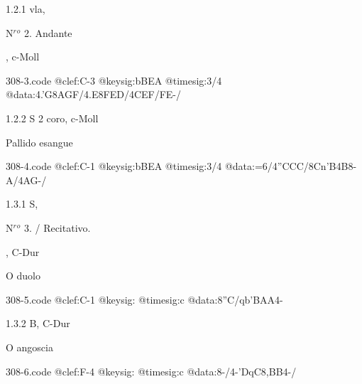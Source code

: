 \documentclass[twocolumn, 12pt]{book}
\begin{document}
\newline %
\par 1.2.1  vla, \begin{itshape}N$^r$$^o$ 2. Andante\end{itshape}, c-Moll  
\begin{filecontents*}{308-3.code}
@clef:C-3
@keysig:bBEA
@timesig:3/4
@data:4.'G{8AGF}/4.E{8FED}/4CEF/FE-/
\end{filecontents*}
\newline %
\par 1.2.2  S 2 coro, c-Moll\newline \begin{footnotesize} Pallido esangue \end{footnotesize}  
\begin{filecontents*}{308-4.code}
@clef:C-1
@keysig:bBEA
@timesig:3/4
@data:=6/4''CCC/{8Cn'B}4B8-A/4AG-/
\end{filecontents*}
\newline %
\par 1.3.1  S, \begin{itshape}N$^r$$^o$ 3. / Recitativo.\end{itshape}, C-Dur\newline \begin{footnotesize} O duolo \end{footnotesize}  
\begin{filecontents*}{308-5.code}
@clef:C-1
@keysig:
@timesig:c
@data:8''C/qb'BAA4-
\end{filecontents*}
\newline %
\par 1.3.2  B, C-Dur\newline \begin{footnotesize} O angoscia \end{footnotesize}  
\begin{filecontents*}{308-6.code}
@clef:F-4
@keysig:
@timesig:c
@data:8-/4-'DqC8,BB4-/
\end{filecontents*}
\end{document}
